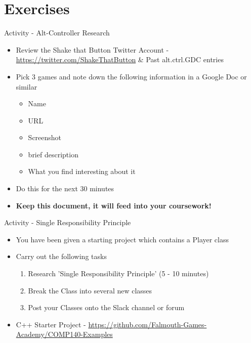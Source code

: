 \part{Exercises}
\frame{\partpage}

\begin{frame}{Activity - Alt-Controller Research}
	\begin{itemize}
		\pause \item Review the Shake that Button Twitter Account - \url{https://twitter.com/ShakeThatButton} \& Past alt.ctrl.GDC entries
		\pause \item Pick 3 games and note down the following information in a Google Doc or similar
		\begin{itemize}
			\pause\item Name
			\item URL
			\item Screenshot
			\item brief description
			\item What you find interesting about it 
		\end{itemize}
		\pause \item Do this for the next 30 minutes
		\pause \item \textbf{Keep this document, it will feed into your coursework!}
	\end{itemize}
\end{frame}

\begin{frame}{Activity - Single Responsibility Principle}
\begin{itemize}
	\pause \item You have been given a starting project which contains a Player class
	\pause \item Carry out the following tasks
	\begin{enumerate}
		\pause \item Research 'Single Responsibility Principle' (5 - 10 minutes)
		\pause \item Break the Class into several new classes
		\pause \item Post your Classes onto the Slack channel or forum  
	\end{enumerate} 
	\pause \item C++ Starter Project - \url{https://github.com/Falmouth-Games-Academy/COMP140-Examples}
\end{itemize}
\end{frame}